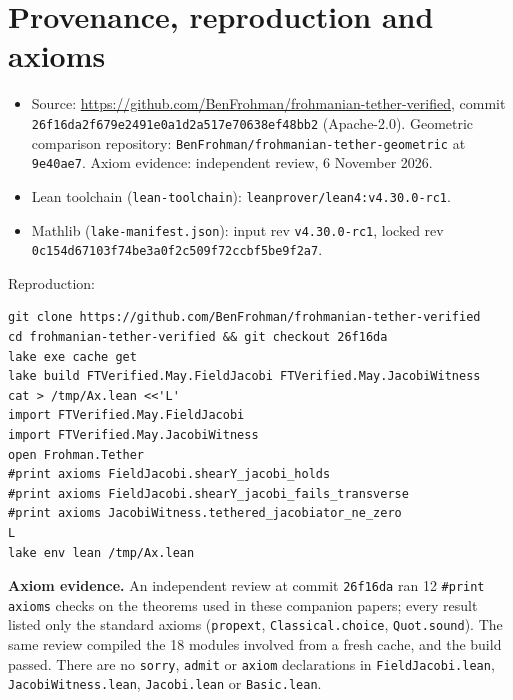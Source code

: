 \documentclass[11pt]{article}\emergencystretch=2em
\theoremstyle{definition}\newtheorem{definition}[theorem]{Definition}\theoremstyle{remark}\newtheorem{remark}[theorem]{Remark}
\begin{document}
\section{Provenance, reproduction and axioms}
\begin{itemize}
\item Source: \url{https://github.com/BenFrohman/frohmanian-tether-verified}, commit\\ \texttt{26f16da2f679e2491e0a1d2a517e70638ef48bb2} (Apache-2.0). Geometric comparison repository: \texttt{BenFrohman/frohmanian-tether-geometric} at \texttt{9e40ae7}. Axiom evidence: independent review, 6 November 2026.
\item Lean toolchain (\texttt{lean-toolchain}): \texttt{leanprover/lean4:v4.30.0-rc1}.
\item Mathlib (\texttt{lake-manifest.json}): input rev \texttt{v4.30.0-rc1}, locked rev\\ \texttt{0c154d67103f74be3a0f2c509f72ccbf5be9f2a7}.
\end{itemize}
Reproduction:
\begin{verbatim}
git clone https://github.com/BenFrohman/frohmanian-tether-verified
cd frohmanian-tether-verified && git checkout 26f16da
lake exe cache get
lake build FTVerified.May.FieldJacobi FTVerified.May.JacobiWitness
cat > /tmp/Ax.lean <<'L'
import FTVerified.May.FieldJacobi
import FTVerified.May.JacobiWitness
open Frohman.Tether
#print axioms FieldJacobi.shearY_jacobi_holds
#print axioms FieldJacobi.shearY_jacobi_fails_transverse
#print axioms JacobiWitness.tethered_jacobiator_ne_zero
L
lake env lean /tmp/Ax.lean
\end{verbatim}
\textbf{Axiom evidence.} An independent review at commit \texttt{26f16da} ran 12 \texttt{\#print axioms} checks on the theorems used in these companion papers; every result listed only the standard axioms (\texttt{propext}, \texttt{Classical.choice}, \texttt{Quot.sound}). The same review compiled the 18 modules involved from a fresh cache, and the build passed. There are no \texttt{sorry}, \texttt{admit} or \texttt{axiom} declarations in \texttt{FieldJacobi.lean}, \texttt{JacobiWitness.lean}, \texttt{Jacobi.lean} or \texttt{Basic.lean}.
\end{document}
